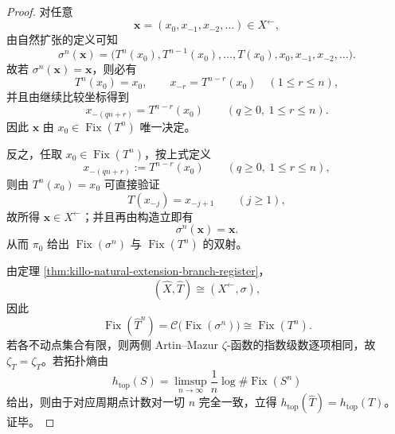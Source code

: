 \begin{proof}
对任意
\[
\mathbf x=(x_0,x_{-1},x_{-2},\dots)\in X^{\leftarrow},
\]
由自然扩张的定义可知
\[
\sigma^n(\mathbf x)
=
\bigl(T^n(x_0),T^{n-1}(x_0),\dots,T(x_0),x_0,x_{-1},x_{-2},\dots\bigr).
\]
故若 \(\sigma^n(\mathbf x)=\mathbf x\)，则必有
\[
T^n(x_0)=x_0,
\qquad
x_{-r}=T^{n-r}(x_0)\quad(1\le r\le n),
\]
并且由继续比较坐标得到
\[
x_{-(qn+r)}=T^{n-r}(x_0)
\qquad(q\ge 0,\ 1\le r\le n).
\]
因此 \(\mathbf x\) 由 \(x_0\in\operatorname{Fix}(T^n)\) 唯一决定。

反之，任取 \(x_0\in\operatorname{Fix}(T^n)\)，按上式定义
\[
x_{-(qn+r)}:=T^{n-r}(x_0)
\qquad(q\ge 0,\ 1\le r\le n),
\]
则由 \(T^n(x_0)=x_0\) 可直接验证
\[
T(x_{-j})=x_{-j+1}\qquad(j\ge 1),
\]
故所得 \(\mathbf x\in X^{\leftarrow}\)；并且再由构造立即有
\[
\sigma^n(\mathbf x)=\mathbf x.
\]
从而 \(\pi_0\) 给出 \(\operatorname{Fix}(\sigma^n)\) 与 \(\operatorname{Fix}(T^n)\) 的双射。

由定理 \ref{thm:killo-natural-extension-branch-register}，
\[
(\widehat X,\widehat T)\cong (X^{\leftarrow},\sigma),
\]
因此
\[
\operatorname{Fix}(\widehat T^n)=\mathcal C\bigl(\operatorname{Fix}(\sigma^n)\bigr)
\cong
\operatorname{Fix}(T^n).
\]
若各不动点集合有限，则两侧 Artin--Mazur \(\zeta\)-函数的指数级数逐项相同，故 \(\zeta_{\widehat T}=\zeta_T\)。若拓扑熵由
\[
h_{\mathrm{top}}(S)
=
\limsup_{n\to\infty}\frac1n\log \#\operatorname{Fix}(S^n)
\]
给出，则由于对应周期点计数对一切 \(n\) 完全一致，立得
\(
h_{\mathrm{top}}(\widehat T)=h_{\mathrm{top}}(T)
\)。
证毕。
\end{proof}

